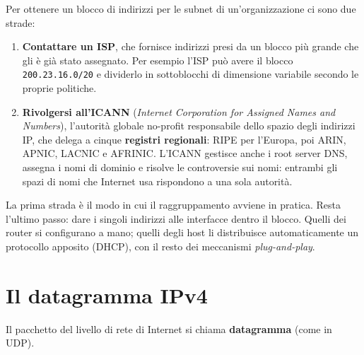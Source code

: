 Per ottenere un blocco di indirizzi per le subnet di un'organizzazione ci sono due strade:

\begin{enumerate}
    \item \textbf{Contattare un ISP}, che fornisce indirizzi presi da un blocco più grande che gli è già stato assegnato. Per
          esempio l'ISP può avere il blocco \texttt{200.23.16.0/20} e dividerlo in sottoblocchi di dimensione variabile
          secondo le proprie politiche.
    \item \textbf{Rivolgersi all'ICANN} (\emph{Internet Corporation for Assigned Names and Numbers}), l'autorità globale no-profit
          responsabile dello spazio degli indirizzi IP, che delega a cinque \textbf{registri regionali}: RIPE per l'Europa,
          poi ARIN, APNIC, LACNIC e AFRINIC. L'ICANN gestisce anche i root server DNS, assegna i nomi di dominio e risolve le
          controversie sui nomi: entrambi gli spazi di nomi che Internet usa rispondono a una sola autorità.
\end{enumerate}

La prima strada è il modo in cui il raggruppamento avviene in pratica. Resta l'ultimo passo: dare i singoli indirizzi
alle interfacce dentro il blocco. Quelli dei router si configurano a mano; quelli degli host li distribuisce
automaticamente un protocollo apposito (DHCP), con il resto dei meccanismi \emph{plug-and-play}.

\section{Il datagramma IPv4}

Il pacchetto del livello di rete di Internet si chiama \textbf{datagramma} (come in UDP).

